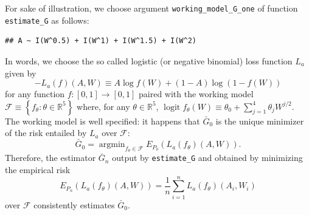 \documentclass[]{article}
\newenvironment{Shaded}{\begin{snugshade}}{\end{snugshade}}
\newcommand{\ControlFlowTok}[1]{\textcolor[rgb]{0.13,0.29,0.53}{\textbf{#1}}}
\newcommand{\DataTypeTok}[1]{\textcolor[rgb]{0.13,0.29,0.53}{#1}}
\newcommand{\DecValTok}[1]{\textcolor[rgb]{0.00,0.00,0.81}{#1}}
\newcommand{\KeywordTok}[1]{\textcolor[rgb]{0.13,0.29,0.53}{\textbf{#1}}}
\newcommand{\NormalTok}[1]{#1}
\newcommand{\OperatorTok}[1]{\textcolor[rgb]{0.81,0.36,0.00}{\textbf{#1}}}
\newcommand{\OtherTok}[1]{\textcolor[rgb]{0.56,0.35,0.01}{#1}}
\newcommand{\StringTok}[1]{\textcolor[rgb]{0.31,0.60,0.02}{#1}}
\DeclareMathOperator{\logit}{logit}
\newcommand{\bbR}{\mathbb{R}}
\newcommand{\calF}{\mathcal{F}}
\newcommand{\Gbar}{\bar{G}}
\theoremstyle{definition}
\theoremstyle{definition}
\theoremstyle{definition}
\theoremstyle{remark}
\begin{document}
For sake of illustration, we choose argument
\texttt{working\_model\_G\_one} of function \texttt{estimate\_G} as
follows:

\begin{Shaded}
\end{Shaded}

\begin{verbatim}
## A ~ I(W^0.5) + I(W^1) + I(W^1.5) + I(W^2)
\end{verbatim}

In words, we choose the so called logistic (or negative binomial) loss
function \(L_{a}\) given by \begin{equation}    \label{eq:logis:loss}
-L_{a}(f)(A,W) \equiv A \log f(W) + (1 - A) \log (1 - f(W)) \end{equation}
for any function \(f : [0,1] \to [0,1]\) paired with the working model
\(\calF \equiv \left\{f_{\theta} : \theta \in \bbR^{5}\right\}\) where,
for any \(\theta \in \bbR^{5}\),
\(\logit f_{\theta} (W) \equiv \theta_{0} + \sum_{j=1}^{4} \theta_{j} W^{j/2}\).
The working model is well specified: it happens that \(\Gbar_{0}\) is
the unique minimizer of the risk entailed by \(L_{a}\) over \(\calF\):
\begin{equation*}\Gbar_{0} = \mathop{\arg\min}_{f_{\theta} \in \calF}
E_{P_{0}}  \left(L_{a}(f_{\theta})(A,W)\right).\end{equation*}
Therefore, the estimator \(\Gbar_{n}\) output by \texttt{estimate\_G}
and obtained by minimizing the empirical risk
\begin{equation*} E_{P_{n}} \left(L_{a}(f_{\theta})(A,W)\right)
=  \frac{1}{n}   \sum_{i=1}^{n}  L_{a}(f_{\theta})(A_{i},W_{i})\end{equation*}
over \(\calF\) consistently estimates \(\Gbar_{0}\).
\end{document}
